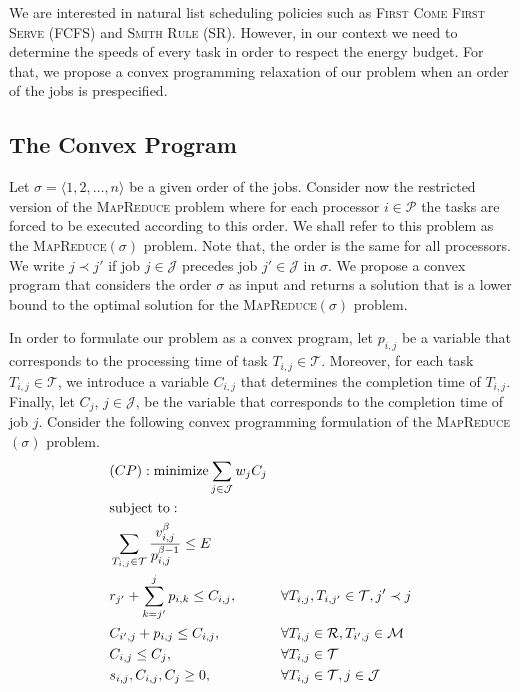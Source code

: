 \documentclass{llncs}
\newcommand{\mr}{\textsc{MapReduce}\xspace}
\newcommand{\mrs}{\textsc{MapReduce$(\sigma)$}\xspace}
\newcommand{\fcfs}{\textsc{FCFS}\xspace}
\newcommand{\sr}{\textsc{SR}\xspace}
\begin{document}
We are interested in natural list scheduling policies such as \textsc{First Come First Serve} (\fcfs) and \textsc{Smith Rule} (\sr). However, in our context we need to determine the speeds of every task in order to respect the energy budget. For that, we propose a convex programming relaxation of our problem when an order of the jobs is prespecified.

\subsection{The Convex Program}

Let $\sigma=\langle1,2,\ldots,n\rangle$ be a given order of the jobs.
Consider now the restricted version of the \mr problem where
for each processor $i \in \mathcal{P}$ the tasks are forced to be executed according to this order.
We shall refer to this problem as the \mrs problem.
Note that, the order is the same for all processors.
We write $j \prec j'$ if job $j \in \mathcal{J}$ precedes job $j' \in \mathcal{J}$ in $\sigma$.
We propose a convex program that considers the order $\sigma$ as input and returns a solution that is
a lower bound to the optimal solution for the \mrs problem.

In order to formulate our problem as a convex program, let $p_{i,j}$ be a variable that corresponds to the processing time of task $T_{i,j} \in \mathcal{T}$.
Moreover, for each task $T_{i,j} \in \mathcal{T}$, we introduce a variable $C_{i,j}$ that determines the completion time of $T_{i,j}$.
Finally, let $C_j$, $j\in \mathcal{J}$, be the variable that corresponds to the completion time of job $j$.
Consider the following convex programming formulation of the \mrs problem.
\begin{align}
 & (CP): \text{minimize} \sum_{j \in \mathcal{J}} w_j C_j && \notag\\
 & \text{subject to}: && \notag\\
 & \sum_{T_{i,j} \in \mathcal{T}} \frac{v_{i,j}^{\beta}}{p_{i,j}^{\beta-1}}\leq E && \label{cp:p1}\\
 & r_{j'} + \sum_{k=j'}^j p_{i,k} \leq C_{i,j}, && \forall T_{i,j}, T_{i,j'} \in \mathcal{T}, j' \prec j \label{cp:p2}\\
 & C_{i',j} + p_{i,j} \leq C_{i,j}, && \forall T_{i,j} \in \mathcal{R}, T_{i',j} \in \mathcal{M} \label{cp:p3}\\
 & C_{i,j} \leq C_j, && \forall T_{i,j} \in \mathcal{T} \label{cp:p4}\\
 & s_{i,j}, C_{i,j}, C_j \geq 0, && \forall T_{i,j} \in \mathcal{T}, j \in \mathcal{J} \notag
\end{align}
\end{document}
